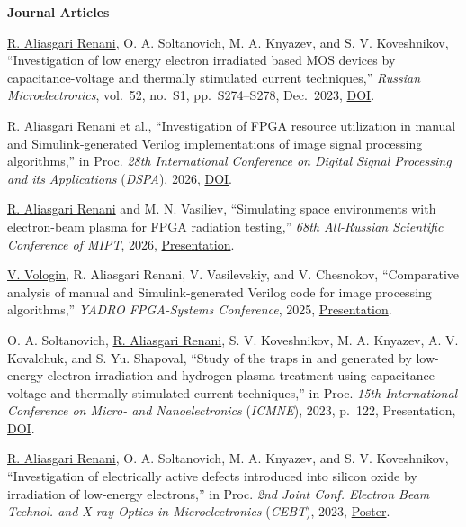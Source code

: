 \noindent\textbf{Journal Articles}
\begin{enumerate}[label={[\arabic*]}, topsep=0cm, itemsep=0cm]
    \item \underline{R. Aliasgari Renani}, O. A. Soltanovich, M. A. Knyazev, and S. V. Koveshnikov, ``Investigation of low energy electron irradiated  based MOS devices by capacitance-voltage and thermally stimulated current techniques,'' \textit{Russian Microelectronics}, vol.~52, no.~S1, pp.~S274--S278, Dec.~2023, \href{https://doi.org/10.1134/S1063739723600516}{DOI}.
\end{enumerate}
\begin{enumerate}[label={[\arabic*]}, topsep=0cm, itemsep=0cm]
    \item \underline{R. Aliasgari Renani} et al., ``Investigation of FPGA resource utilization in manual and Simulink-generated Verilog implementations of image signal processing algorithms,'' in Proc. \textit{28th International Conference on Digital Signal Processing and its Applications} (\textit{DSPA}), 2026, \href{https://doi.org/10.1109/DSPA69176.2026.11476776}{DOI}.
\end{enumerate}
\begin{enumerate}[label={[\arabic*]}, topsep=0cm, itemsep=0cm]
    \item \underline{R. Aliasgari Renani} and M. N. Vasiliev, ``Simulating space environments with electron-beam plasma for FPGA radiation testing,'' \textit{68th All-Russian Scientific Conference of MIPT}, 2026, \href{https://conf.mipt.ru/conference/23999}{Presentation}.
    \item \underline{V. Vologin}, R. Aliasgari Renani, V. Vasilevskiy, and V. Chesnokov, ``Comparative analysis of manual and Simulink-generated Verilog code for image processing algorithms,'' \textit{YADRO FPGA-Systems Conference}, 2025, \href{https://meetups.yadro.com/fpga-msk-1125/}{Presentation}.
    \item O. A. Soltanovich, \underline{R. Aliasgari Renani}, S. V. Koveshnikov, M. A. Knyazev, A. V. Kovalchuk, and S. Yu. Shapoval, ``Study of the traps in  and  generated by low-energy electron irradiation and hydrogen plasma treatment using capacitance-voltage and thermally stimulated current techniques,'' in Proc. \textit{15th International Conference on Micro- and Nanoelectronics} (\textit{ICMNE}), 2023, p.~122, Presentation, \href{https://doi.org/10.29003/m3563.ICMNE-2023}{DOI}.
    \item \underline{R. Aliasgari Renani}, O. A. Soltanovich, M. A. Knyazev, and S. V. Koveshnikov, ``Investigation of electrically active defects introduced into silicon oxide by irradiation of low-energy electrons,'' in Proc. \textit{2nd Joint Conf. Electron Beam Technol. and X-ray Optics in Microelectronics} (\textit{CEBT}), 2023, \href{https://cebt23.iptm.ru/download/numbered/91.pdf}{Poster}.

\end{enumerate}

